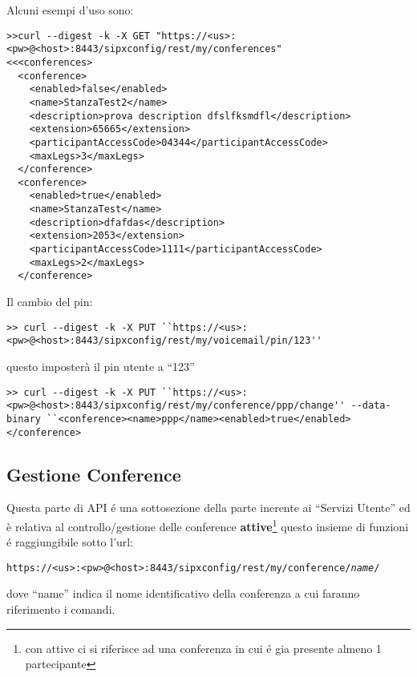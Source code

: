 \bigskip
Alcuni esempi d'uso sono:
\bigskip

\begin{lstlisting}
>>curl --digest -k -X GET "https://<us>:<pw>@<host>:8443/sipxconfig/rest/my/conferences"
<<<conferences>
  <conference>
    <enabled>false</enabled>
    <name>StanzaTest2</name>
    <description>prova description dfslfksmdfl</description>
    <extension>65665</extension>
    <participantAccessCode>04344</participantAccessCode>
    <maxLegs>3</maxLegs>
  </conference>
  <conference>
    <enabled>true</enabled>
    <name>StanzaTest</name>
    <description>dfafdas</description>
    <extension>2053</extension>
    <participantAccessCode>1111</participantAccessCode>
    <maxLegs>2</maxLegs>
  </conference>
\end{lstlisting}
\bigskip

Il cambio del pin:
\bigskip
\begin{lstlisting}
>> curl --digest -k -X PUT ``https://<us>:<pw>@<host>:8443/sipxconfig/rest/my/voicemail/pin/123''
\end{lstlisting}
\bigskip

questo imposter\`a il pin utente a ``123''
\bigskip
\begin{lstlisting}
>> curl --digest -k -X PUT ``https://<us>:<pw>@<host>:8443/sipxconfig/rest/my/conference/ppp/change'' --data-binary ``<conference><name>ppp</name><enabled>true</enabled></conference>
\end{lstlisting}

\subsection{Gestione Conference}

Questa parte di API \'e una sottosezione della parte inerente ai ``Servizi Utente'' ed \`e relativa al controllo/gestione delle conference 
\textbf{attive}\footnote{con attive ci si riferisce ad una conferenza in cui \'e gia presente almeno 1 partecipante}
questo insieme di funzioni \'e raggiungibile sotto l'url:

\bigskip

\texttt{https://<us>:<pw>@<host>:8443/sipxconfig/rest/my/conference/\emph{name}/}

dove ``name'' indica il nome identificativo della conferenza a cui faranno riferimento i comandi.

\bigskip

